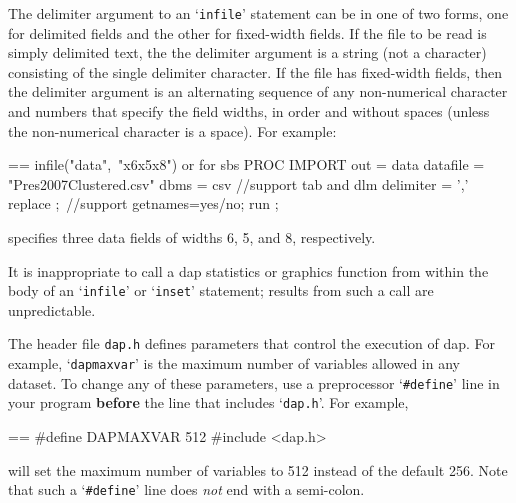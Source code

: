 \documentclass{book}
\makeatletter
\newenvironment{Texinfopreformatted}{%
  \par\GNUTobeylines\obeyspaces\frenchspacing\parskip=\z@\parindent=\z@}{}
{\catcode`\^^M=13 \gdef\GNUTobeylines{\catcode`\^^M=13 \def^^M{\null\par}}}
\newenvironment{Texinfoindented}{\begin{list}{}{}\item\relax}{\end{list}}
\renewcommand{\_}{\Texinfounderscore\discretionary{}{}{}}
\makeatother
\begin{document}
The delimiter
%
argument to an `\texttt{infile}'
%
statement can be in one of two forms, one for
delimited fields and the other for fixed-width
%
fields.
If the file to be read is simply delimited text, the
the delimiter argument is a string (not a character) consisting
of the single delimiter character.  If the file has fixed-width fields, then
the delimiter argument is an alternating sequence of any non-numerical
character and numbers that specify the field widths, in order and
without spaces (unless the non-numerical character is a space).  For
example:

\begin{Texinfoindented}
\begin{Texinfopreformatted}%
\ttfamily infile("data",\ "x6x5x8")
or for sbs
PROC IMPORT  out = data datafile =  "Pres2007Clustered.csv"  dbms  = csv //support tab and dlm
delimiter = ',' replace ;\  //support getnames=yes/no;
run ;
\end{Texinfopreformatted}
\end{Texinfoindented}
\noindent{}specifies three data fields of widths 6, 5, and 8, respectively.

It is inappropriate to call a dap statistics or graphics function from
within the body of an `\texttt{infile}' or `\texttt{inset}' statement; results from such a
call are unpredictable.

The header file \texttt{dap.h} defines parameters
%
%
%
%
%
%
that control the execution of dap.  For example, `\texttt{dap\_maxvar}' is the maximum
number of variables allowed in any dataset.
To change any of these parameters, use a preprocessor `\texttt{\#define}' line
in your program \textbf{before} the line that includes `\texttt{dap.h}'.
For example,

\begin{Texinfoindented}
\begin{Texinfopreformatted}%
\ttfamily \#define DAP\_MAXVAR 512
\#include <dap.h>
\end{Texinfopreformatted}
\end{Texinfoindented}
\noindent{}will set the maximum number of variables to 512 instead of the default 256.
Note that such a `\texttt{\#define}' line does \emph{not} end with a semi-colon.
\end{document}
